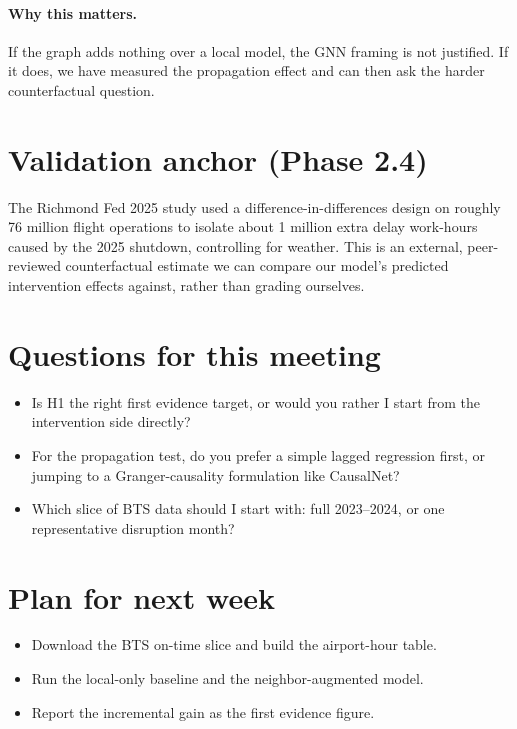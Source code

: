 \documentclass[11pt]{article}
\begin{document}
\paragraph{Why this matters.} If the graph adds nothing over a local model,
the GNN framing is not justified. If it does, we have measured the propagation
effect and can then ask the harder counterfactual question.

\section{Validation anchor (Phase 2.4)}
The Richmond Fed 2025 study used a difference-in-differences design on roughly
76 million flight operations to isolate about 1 million extra delay work-hours
caused by the 2025 shutdown, controlling for weather. This is an external,
peer-reviewed counterfactual estimate we can compare our model's predicted
intervention effects against, rather than grading ourselves.

\section{Questions for this meeting}
\begin{itemize}[leftmargin=*]
  \item Is H1 the right first evidence target, or would you rather I start
        from the intervention side directly?
  \item For the propagation test, do you prefer a simple lagged regression
        first, or jumping to a Granger-causality formulation like CausalNet?
  \item Which slice of BTS data should I start with: full 2023--2024, or one
        representative disruption month?
\end{itemize}

\section{Plan for next week}
\begin{itemize}[leftmargin=*]
  \item Download the BTS on-time slice and build the airport-hour table.
  \item Run the local-only baseline and the neighbor-augmented model.
  \item Report the incremental gain as the first evidence figure.
\end{itemize}
\end{document}
